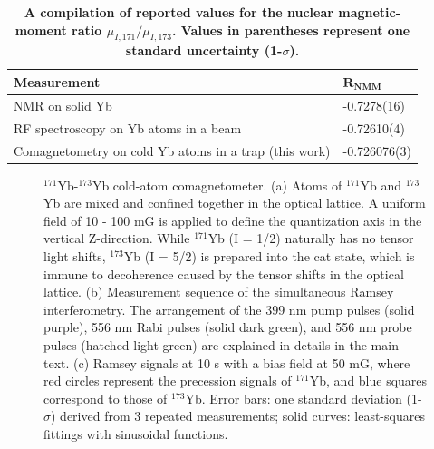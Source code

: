 \documentclass[pdflatex,sn-nature,centre]{sn-jnl}%
\begin{document}
\begin{table}[htbp]
    \centering
    \caption{\textbf{A compilation of reported values for the nuclear magnetic-moment ratio $\mu_{I,171}/\mu_{I,173}$. Values in parentheses represent one standard uncertainty (1-$\sigma$). }
    } 
    \label{Rcompare}
    \begin{tabular}{l l}
        \toprule
        \textbf{Measurement} & $\mathbf{R_{NMM}}$ \\
        \midrule
        NMR on solid Yb \cite{Gossard1964RefNMR} & -0.7278(16) \\
        RF spectroscopy on Yb atoms in a beam \cite{Olschewski1972Ref} & -0.72610(4) \\
        \addlinespace[0.5em]
        Comagnetometry on cold Yb atoms in a trap (this work) & -0.726076(3) \\
        \bottomrule
    \end{tabular}
\end{table}


\begin{figure}[htbp]
    \centering
    \caption{
     $^{171}$Yb-$^{173}$Yb cold-atom comagnetometer. 
     (a) Atoms of $^{171}$Yb and $^{173}$Yb are mixed and confined together in the optical lattice. A uniform field of 10 - 100 mG is applied to define the quantization axis in the vertical Z-direction. While $^{171}$Yb (I = 1/2) naturally has no tensor light shifts, $^{173}$Yb (I = 5/2) is prepared into the cat state, which is immune to decoherence caused by the tensor shifts in the optical lattice.
     (b) Measurement sequence of the simultaneous Ramsey interferometry. The arrangement of the 399 nm pump pulses (solid purple), 556 nm Rabi pulses (solid dark green), and 556 nm probe pulses (hatched light green) are explained in details in the main text.
     (c) Ramsey signals at 10 s with a bias field at 50 mG, where red circles represent the precession signals of $^{171}$Yb, and blue squares correspond to those of $^{173}$Yb. Error bars: one standard deviation (1-$\sigma$) derived from 3 repeated measurements; solid curves: least-squares fittings with sinusoidal functions.
     }
    \label{fig1}
\end{figure}
\end{document}
